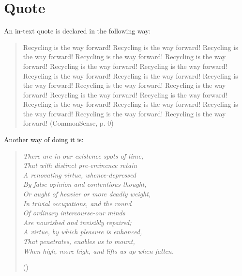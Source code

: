\pagebreak

\section{Quote}
 An in-text quote is declared in the following way:

\begin{quote}

Recycling is the way forward! Recycling is the way forward! Recycling is the way forward! Recycling is the way forward! Recycling is the way forward! Recycling is the way forward! Recycling is the way forward! Recycling is the way forward! Recycling is the way forward! Recycling is the way forward! Recycling is the way forward! Recycling is the way forward! Recycling is the way forward! Recycling is the way forward! Recycling is the way forward! Recycling is the way forward! Recycling is the way forward! Recycling is the way forward! Recycling is the way forward!    (CommonSense, p. 0) 

 \end{quote}

Another way of doing it is:
\begin{quote}
{
\centering
\emph{There are in our existence spots of time, \\
That with distinct pre-eminence retain \\
A renovating virtue, whence-depressed \\
By false opinion and contentious thought, \\
Or aught of heavier or more deadly weight, \\
In trivial occupations, and the round \\
Of ordinary intercourse-our minds \\ 
Are nourished and invisibly repaired; \\ 
A virtue, by which pleasure is enhanced, \\ 
That penetrates, enables us to mount, \\ 
When high, more high, and lifts us up when fallen. \\ 
}

()

}


\end{quote}








